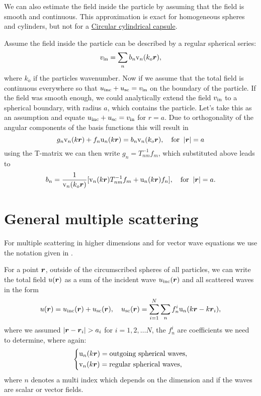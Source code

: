 \documentclass[ 12pt, a4paper]{article}
\begin{document}
We can also estimate the field inside the particle by assuming that the field is smooth and continuous. This approximation is exact for homogeneous spheres and cylinders, but not for a \href{acoustics.pdf}{Circular cylindrical capsule}.

Assume the field inside the particle can be described by a regular spherical series:
\begin{equation}
  v_{\mathrm{in}} = \sum_n b_n \mathrm v_n(k_o \boldsymbol{r}),
\end{equation}
where $k_o$ if the particles wavenumber. Now if we assume that the total field is continuous everywhere so that $u_{\mathrm{inc}} + u_{\mathrm{sc}} = v_{\mathrm{in}}$ on the boundary of the particle. If the field was smooth enough, we could analytically extend the field $v_{\mathrm{in}}$ to a spherical boundary, with radius $a$, which contains the particle. Let's take this as an assumption and equate $u_{\mathrm{inc}} + u_{\mathrm{sc}} = v_{\mathrm{in}}$ for $r=a$. Due to orthogonality of the angular components of the basis functions this will result in
\begin{equation}
   g_n \mathrm v_{n}(k\boldsymbol{r}) + f_n \mathrm u_{n}(k\boldsymbol{r}) = b_n \mathrm v_n(k_o \boldsymbol{r}), \quad \text{for} \;\; |\boldsymbol{r}| = a
\end{equation}
using the T-matrix we can then write $g_n = T_{nm}^{-1} f_m$, which substituted above leads to
\begin{equation}
    b_n = \frac{1}{\mathrm v_n(k_o \boldsymbol{r})}[ \mathrm v_{n}(k\boldsymbol{r}) T_{nm}^{-1} f_m + \mathrm u_{n}(k\boldsymbol{r}) f_n], \quad \text{for} \;\; |\boldsymbol{r}| = a.
\end{equation}

\section{General multiple scattering}

For multiple scattering in higher dimensions and for vector wave equations we use the notation given in \cite{gower2020effective}.

For a point $\boldsymbol{r}$, outside of the circumscribed spheres of all particles, we can write the total field $u(\boldsymbol{r})$ as a sum of the incident wave $u_{\mathrm{inc}}(\boldsymbol{r})$ and all scattered waves in the form~\cite{Kristensson2015a,Kristensson2016,Linton+Martin2006}
\begin{equation} \label{eqn:total_discrete_wave}
    u(\boldsymbol{r}) = u_{\mathrm{inc}}(\boldsymbol{r}) + u_{\mathrm{sc}}(\boldsymbol{r}), \quad u_{\mathrm{sc}}(\boldsymbol{r}) =  \sum_{i=1}^N \sum_n f_n^i \mathrm u_n (k \boldsymbol{r} - k \boldsymbol{r}_i),
\end{equation}
where we assumed $ |\boldsymbol{r} - \boldsymbol{r}_i| > a_i $ for $i=1,2,\ldots N$, the $f_n^i$ are coefficients we need to determine, where again:
\begin{equation}
\left\{\begin{aligned}
    & \mathrm u_{n}(k\boldsymbol{r}) = \text{outgoing spherical waves},
    \label{eqn:outgoing_waves_and_regular_waves}
    \\
    & \mathrm v_{n}(k\boldsymbol{r})= \text{regular spherical waves},
 \end{aligned}\right.
\end{equation}
where $n$ denotes a multi index which depends on the dimension and if the waves are scalar or vector fields.
\end{document}
